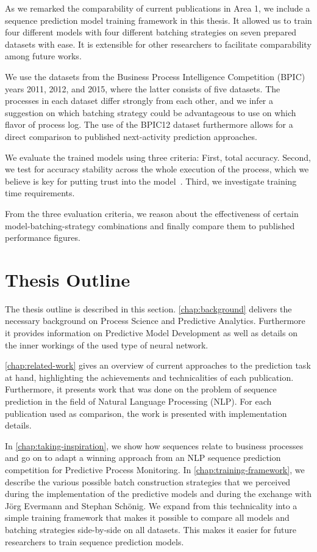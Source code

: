 As we remarked the comparability of current publications in Area 1, we include a sequence prediction model training framework in this thesis. It allowed us to train four different models with four different batching strategies on seven prepared datasets with ease. It is extensible for other researchers to facilitate comparability among future works.

We use the datasets from the Business Process Intelligence Competition (BPIC) years 2011, 2012, and 2015, where the latter consists of five datasets. The processes in each dataset differ strongly from each other, and we infer a suggestion on which batching strategy could be advantageous to use on which flavor of process log. The use of the BPIC12 dataset furthermore allows for a direct comparison to published next-activity prediction approaches.

We evaluate the trained models using three criteria: First, total accuracy. Second, we test for accuracy stability across the whole execution of the process, which we believe is key for putting trust into the model~\cite{francescomarino2015, boehmer2018probability}. Third, we investigate training time requirements.

From the three evaluation criteria, we reason about the effectiveness of certain model-batching-strategy combinations and finally compare them to published performance figures.

\section{Thesis Outline}\label{sec:intro:outline}
The thesis outline is described in this section. \autoref{chap:background} delivers the necessary background on Process Science and Predictive Analytics. Furthermore it provides information on Predictive Model Development as well as details on the inner workings of the used type of neural network.

\autoref{chap:related-work} gives an overview of current approaches to the prediction task at hand, highlighting the achievements and technicalities of each publication. Furthermore, it presents work that was done on the problem of sequence prediction in the field of Natural Language Processing (NLP). For each publication used as comparison, the work is presented with implementation details.

In \autoref{chap:taking-inspiration}, we show how sequences relate to business processes and go on to adapt a winning approach from an NLP sequence prediction competition for Predictive Process Monitoring. In \autoref{chap:training-framework}, we describe the various possible batch construction strategies that we perceived during the implementation of the predictive models and during the exchange with Jörg Evermann and Stephan Schönig. We expand from this technicality into a simple training framework that makes it possible to compare all models and batching strategies side-by-side on all datasets. This makes it easier for future researchers to train sequence prediction models.


